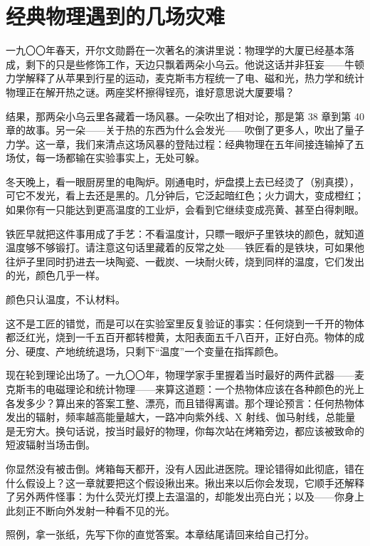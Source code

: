 \chapter{经典物理遇到的几场灾难}

一九〇〇年春天，开尔文勋爵在一次著名的演讲里说：物理学的大厦已经基本落成，剩下的只是些修饰工作，天边只飘着两朵小乌云。他说这话并非狂妄——牛顿力学解释了从苹果到行星的运动，麦克斯韦方程统一了电、磁和光，热力学和统计物理正在解开热之谜。两座奖杯擦得锃亮，谁好意思说大厦要塌？

结果，那两朵小乌云里各藏着一场风暴。一朵吹出了相对论，那是第 38 章到第 40 章的故事。另一朵——关于热的东西为什么会发光——吹倒了更多人，吹出了量子力学。这一章，我们来清点这场风暴的登陆过程：经典物理在五年间接连输掉了五场仗，每一场都输在实验事实上，无处可躲。


冬天晚上，看一眼厨房里的电陶炉。刚通电时，炉盘摸上去已经烫了（别真摸），可它不发光，看上去还是黑的。几分钟后，它泛起暗红色；火力调大，变成橙红；如果你有一只能达到更高温度的工业炉，会看到它继续变成亮黄、甚至白得刺眼。

铁匠早就把这件事用成了手艺：不看温度计，只瞟一眼炉子里铁块的颜色，就知道温度够不够锻打。请注意这句话里藏着的反常之处——铁匠看的是铁块，可如果他往炉子里同时扔进去一块陶瓷、一截炭、一块耐火砖，烧到同样的温度，它们发出的光，颜色几乎一样。

颜色只认温度，不认材料。

这不是工匠的错觉，而是可以在实验室里反复验证的事实：任何烧到一千开的物体都泛红光，烧到一千五百开都转橙黄，太阳表面五千八百开，正好白亮。物体的成分、硬度、产地统统退场，只剩下“温度”一个变量在指挥颜色。

现在轮到理论出场了。一九〇〇年，物理学家手里握着当时最好的两件武器——麦克斯韦的电磁理论和统计物理——来算这道题：一个热物体应该在各种颜色的光上各发多少？算出来的答案工整、漂亮，而且错得离谱。那个理论预言：任何热物体发出的辐射，频率越高能量越大，一路冲向紫外线、X 射线、伽马射线，总能量是无穷大。换句话说，按当时最好的物理，你每次站在烤箱旁边，都应该被致命的短波辐射当场击倒。

你显然没有被击倒。烤箱每天都开，没有人因此进医院。理论错得如此彻底，错在什么假设上？这一章就要把这个假设揪出来。揪出来以后你会发现，它顺手还解释了另外两件怪事：为什么荧光灯摸上去温温的，却能发出亮白光；以及——你身上此刻正不断向外发射一种看不见的光。


照例，拿一张纸，先写下你的直觉答案。本章结尾请回来给自己打分。

